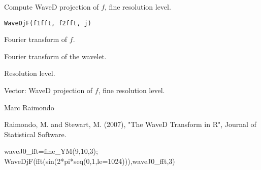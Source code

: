 \begin{Description}\relax
Compute WaveD projection of $f$, fine resolution level.
\end{Description}
\begin{Usage}
\begin{verbatim}
WaveDjF(f1fft, f2fft, j)
\end{verbatim}
\end{Usage}
\begin{Arguments}
\begin{ldescription}
\item[\code{y\_fft}] Fourier transform of $f$. 
\item[\code{f2fft}] Fourier transform of the wavelet.
\item[\code{j}] Resolution level. 
\end{ldescription}
\end{Arguments}
\begin{Value}
Vector:  WaveD projection of $f$, fine resolution level.
\end{Value}
\begin{Author}\relax
Marc Raimondo
\end{Author}
\begin{References}\relax
Raimondo, M. and Stewart, M. (2007),
"The WaveD Transform in R", Journal of Statistical Software.
\end{References}
\begin{SeeAlso}\relax
{}
\end{SeeAlso}
\begin{Examples}
\begin{ExampleCode}

waveJ0_fft=fine_YM(9,10,3);
WaveDjF(fft(sin(2*pi*seq(0,1,le=1024))),waveJ0_fft,3)
\end{ExampleCode}
\end{Examples}

